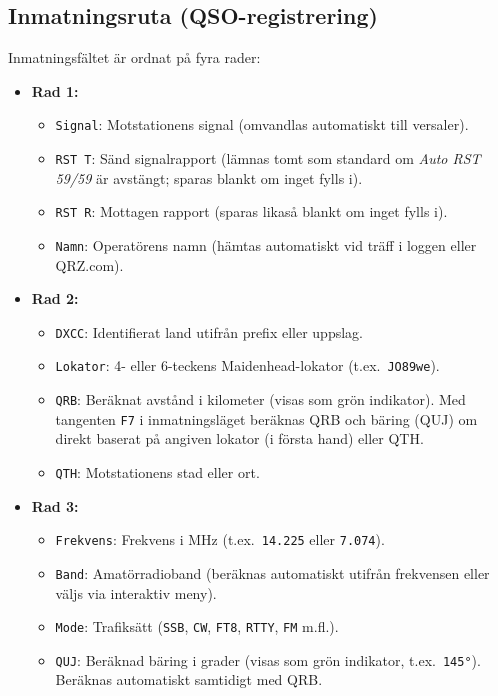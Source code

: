 \documentclass[11pt,a4paper]{article}
\begin{document}
\subsection{Inmatningsruta (QSO-registrering)}
Inmatningsfältet är ordnat på fyra rader:
\begin{itemize}
    \item \textbf{Rad 1:}
    \begin{itemize}
        \item \texttt{Signal}: Motstationens signal (omvandlas automatiskt till versaler).
        \item \texttt{RST T}: Sänd signalrapport (lämnas tomt som standard om \emph{Auto RST 59/59} är avstängt; sparas blankt om inget fylls i).
        \item \texttt{RST R}: Mottagen rapport (sparas likaså blankt om inget fylls i).
        \item \texttt{Namn}: Operatörens namn (hämtas automatiskt vid träff i loggen eller QRZ.com).
    \end{itemize}
    \item \textbf{Rad 2:}
    \begin{itemize}
        \item \texttt{DXCC}: Identifierat land utifrån prefix eller uppslag.
        \item \texttt{Lokator}: 4- eller 6-teckens Maidenhead-lokator (t.ex.\ \texttt{JO89we}).
        \item \texttt{QRB}: Beräknat avstånd i kilometer (visas som grön indikator). Med tangenten \texttt{F7} i inmatningsläget beräknas QRB och bäring (QUJ) om direkt baserat på angiven lokator (i första hand) eller QTH.
        \item \texttt{QTH}: Motstationens stad eller ort.
    \end{itemize}
    \item \textbf{Rad 3:}
    \begin{itemize}
        \item \texttt{Frekvens}: Frekvens i MHz (t.ex.\ \texttt{14.225} eller \texttt{7.074}).
        \item \texttt{Band}: Amatörradioband (beräknas automatiskt utifrån frekvensen eller väljs via interaktiv meny).
        \item \texttt{Mode}: Trafiksätt (\texttt{SSB}, \texttt{CW}, \texttt{FT8}, \texttt{RTTY}, \texttt{FM} m.fl.).
        \item \texttt{QUJ}: Beräknad bäring i grader (visas som grön indikator, t.ex.\ \texttt{145°}). Beräknas automatiskt samtidigt med QRB.

\end{itemize}
\end{itemize}
\end{document}
